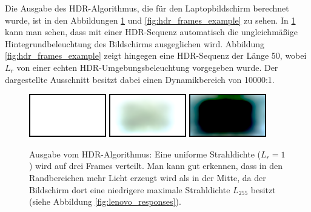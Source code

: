    Die Ausgabe des HDR-Algorithmus, die für den Laptopbildschirm berechnet wurde, ist in den Abbildungen \ref{fig:hdr_frames_example_uniform} und \ref{fig:hdr_frames_example} zu sehen. 
   In \ref{fig:hdr_frames_example_uniform} kann man sehen, dass mit einer HDR-Sequenz automatisch die ungleichmäßige Hintegrundbeleuchtung des Bildschirms ausgeglichen wird.
   Abbildung \ref{fig:hdr_frames_example} zeigt hingegen eine HDR-Sequenz der Länge 50, wobei $L_r$ von einer echten HDR-Umgebungsbeleuchtung vorgegeben wurde. 
   Der dargestellte Ausschnitt besitzt dabei einen Dynamikbereich von 10000:1.
   
  
   \begin{figure}[h]
    \centering
       \includegraphics[width=0.3\textwidth]{../graphics/hdr_beleuchtung/white_frame_0.png} 
       \includegraphics[width=0.3\textwidth]{../graphics/hdr_beleuchtung/white_frame_1.png} 
       \includegraphics[width=0.3\textwidth]{../graphics/hdr_beleuchtung/white_frame_2.png} 
    \caption[HDR-Frames: Uniforme Strahldichte]{ Ausgabe vom HDR-Algorithmus: Eine uniforme Strahldichte ($L_r=1$) wird auf drei Frames verteilt. Man kann gut erkennen, dass in den Randbereichen mehr Licht erzeugt wird als in der Mitte, da der Bildschirm dort eine niedrigere maximale Strahldichte $L_{255}$ besitzt (siehe Abbildung \ref{fig:lenovo_responses}).
    } 
    \label{fig:hdr_frames_example_uniform}
   \end{figure}

